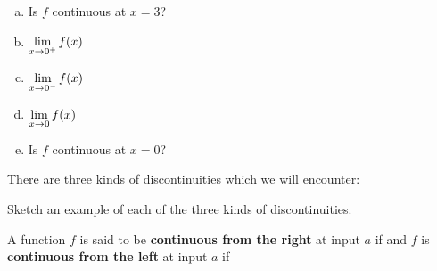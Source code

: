 \documentclass[notes]{subfiles}
\begin{document}
\begin{ex}
\begin{minipage}{\textwidth}
\begin{multicols*}{3}
\begin{enumerate}[(a)]
				\item Is $f$ continuous at $x =3 $?\\[50pt]
					\columnbreak
				\item $\displaystyle \lim_{x\to 0^+} f(x)$\\[50pt] 
				\item $\displaystyle \lim_{x\to 0^-} f(x)$\\[50pt]  
				\item $\displaystyle \lim_{x\to 0} f(x)$\\[50pt] 
				\item Is $f$ continuous at $x =0 $?\\[50pt]
			\end{enumerate}
				\raggedcolumns
			\end{multicols*}
		\end{minipage}
		\end{ex}
			\newpage

		\begin{rmk}
			There are three kinds of discontinuities which we will encounter:
		\end{rmk}
			
		\begin{ex}
			Sketch an example of each of the three kinds of discontinuities.
		\end{ex}

		\begin{defn}
			A function $f$ is said to be \textbf{continuous from the right} at input $a$ if
			and $f$ is \textbf{continuous from the left} at input $a$ if 
		\end{defn}	
		
\end{document}
